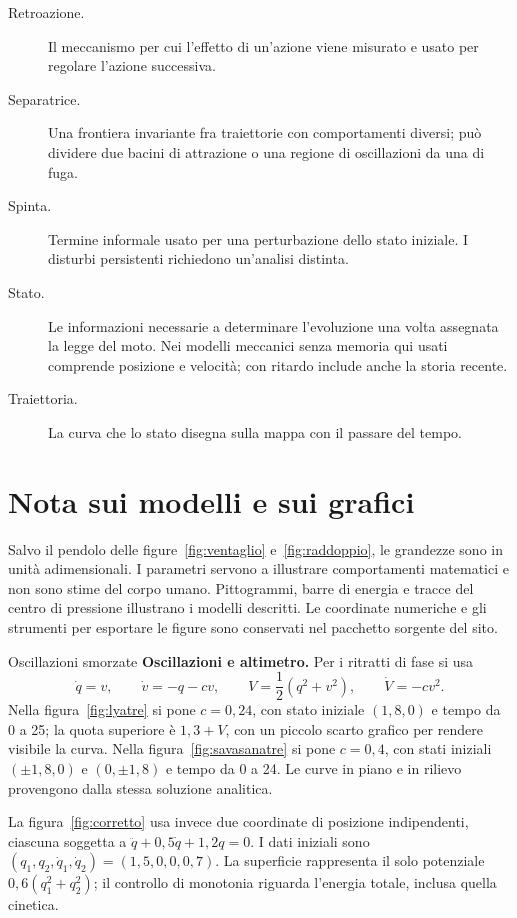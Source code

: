 \documentclass[11pt,a4paper,twoside=false,headinclude,footinclude]{scrartcl}
\begin{document}
{\begin{description}
\item[Retroazione.] Il meccanismo per cui l'effetto di un'azione viene misurato e usato per regolare l'azione successiva.
\item[Separatrice.] Una frontiera invariante fra traiettorie con comportamenti diversi; può dividere due bacini di attrazione o una regione di oscillazioni da una di fuga.
\item[Spinta.] Termine informale usato per una perturbazione dello stato iniziale. I disturbi persistenti richiedono un'analisi distinta.
\item[Stato.] Le informazioni necessarie a determinare l'evoluzione una volta assegnata la legge del moto. Nei modelli meccanici senza memoria qui usati comprende posizione e velocità; con ritardo include anche la storia recente.
\item[Traiettoria.] La curva che lo stato disegna sulla mappa con il passare del tempo.
\end{description}}

\section*{Nota sui modelli e sui grafici}

Salvo il pendolo delle figure~\ref{fig:ventaglio} e~\ref{fig:raddoppio}, le grandezze sono in unità adimensionali. I parametri servono a illustrare comportamenti matematici e non sono stime del corpo umano. Pittogrammi, barre di energia e tracce del centro di pressione illustrano i modelli descritti. Le coordinate numeriche e gli strumenti per esportare le figure sono conservati nel pacchetto sorgente del sito.

\begin{formule}{Oscillazioni smorzate}
\textbf{Oscillazioni e altimetro.} Per i ritratti di fase si usa
\[
 \dot q=v,\qquad \dot v=-q-cv,\qquad
 V=\frac{1}{2}(q^2+v^2),\qquad \dot V=-cv^2.
\]
Nella figura~\ref{fig:lyatre} si pone $c=0{,}24$, con stato iniziale $(1{,}8,0)$ e tempo da 0 a 25; la quota superiore è $1{,}3+V$, con un piccolo scarto grafico per rendere visibile la curva. Nella figura~\ref{fig:savasanatre} si pone $c=0{,}4$, con stati iniziali $(\pm1{,}8,0)$ e $(0,\pm1{,}8)$ e tempo da 0 a 24. Le curve in piano e in rilievo provengono dalla stessa soluzione analitica.

La figura~\ref{fig:corretto} usa invece due coordinate di posizione indipendenti, ciascuna soggetta a $\ddot q+0{,}5\dot q+1{,}2q=0$. I dati iniziali sono $(q_1,q_2,\dot q_1,\dot q_2)=(1{,}5,0,0,0{,}7)$. La superficie rappresenta il solo potenziale $0{,}6(q_1^2+q_2^2)$; il controllo di monotonia riguarda l'energia totale, inclusa quella cinetica.
\end{formule}
\end{document}
